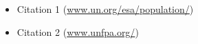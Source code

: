 \lipsum[1-4]

\begin{freading}
\begin{itemize}
\item Citation 1
(\url{www.un.org/esa/population/})
\item Citation 2
(\url{www.unfpa.org/}) 
\end{itemize}
\end{freading}